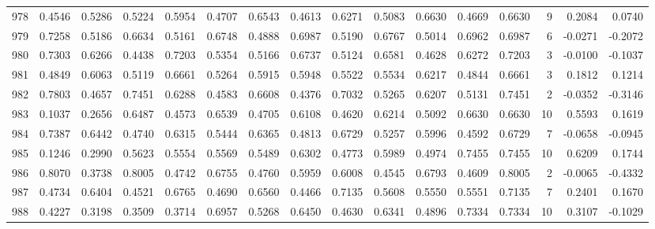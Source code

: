 \begin{tabular}{lrrrrrrrrrrrrrrr}
978 &      0.4546 &  0.5286 &  0.5224 &  0.5954 &  0.4707 &  0.6543 &  0.4613 &  0.6271 &  0.5083 &  0.6630 &   0.4669 &     0.6630 &      9 &                    0.2084 &                     0.0740 \\
979 &      0.7258 &  0.5186 &  0.6634 &  0.5161 &  0.6748 &  0.4888 &  0.6987 &  0.5190 &  0.6767 &  0.5014 &   0.6962 &     0.6987 &      6 &                   -0.0271 &                    -0.2072 \\
980 &      0.7303 &  0.6266 &  0.4438 &  0.7203 &  0.5354 &  0.5166 &  0.6737 &  0.5124 &  0.6581 &  0.4628 &   0.6272 &     0.7203 &      3 &                   -0.0100 &                    -0.1037 \\
981 &      0.4849 &  0.6063 &  0.5119 &  0.6661 &  0.5264 &  0.5915 &  0.5948 &  0.5522 &  0.5534 &  0.6217 &   0.4844 &     0.6661 &      3 &                    0.1812 &                     0.1214 \\
982 &      0.7803 &  0.4657 &  0.7451 &  0.6288 &  0.4583 &  0.6608 &  0.4376 &  0.7032 &  0.5265 &  0.6207 &   0.5131 &     0.7451 &      2 &                   -0.0352 &                    -0.3146 \\
983 &      0.1037 &  0.2656 &  0.6487 &  0.4573 &  0.6539 &  0.4705 &  0.6108 &  0.4620 &  0.6214 &  0.5092 &   0.6630 &     0.6630 &     10 &                    0.5593 &                     0.1619 \\
984 &      0.7387 &  0.6442 &  0.4740 &  0.6315 &  0.5444 &  0.6365 &  0.4813 &  0.6729 &  0.5257 &  0.5996 &   0.4592 &     0.6729 &      7 &                   -0.0658 &                    -0.0945 \\
985 &      0.1246 &  0.2990 &  0.5623 &  0.5554 &  0.5569 &  0.5489 &  0.6302 &  0.4773 &  0.5989 &  0.4974 &   0.7455 &     0.7455 &     10 &                    0.6209 &                     0.1744 \\
986 &      0.8070 &  0.3738 &  0.8005 &  0.4742 &  0.6755 &  0.4760 &  0.5959 &  0.6008 &  0.4545 &  0.6793 &   0.4609 &     0.8005 &      2 &                   -0.0065 &                    -0.4332 \\
987 &      0.4734 &  0.6404 &  0.4521 &  0.6765 &  0.4690 &  0.6560 &  0.4466 &  0.7135 &  0.5608 &  0.5550 &   0.5551 &     0.7135 &      7 &                    0.2401 &                     0.1670 \\
988 &      0.4227 &  0.3198 &  0.3509 &  0.3714 &  0.6957 &  0.5268 &  0.6450 &  0.4630 &  0.6341 &  0.4896 &   0.7334 &     0.7334 &     10 &                    0.3107 &                    -0.1029 \\

\end{tabular}
